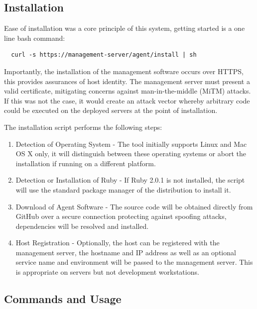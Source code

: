 \documentclass{cshonours}
\begin{document}
\subsection{Installation}

Ease of installation was a core principle of this system, getting started is a one line bash command:

\begin{verbatim}
  curl -s https://management-server/agent/install | sh
\end{verbatim}

Importantly, the installation of the management software occurs over HTTPS, this provides assurances of host identity. The management server must present a valid certificate, mitigating concerns against man-in-the-middle (MiTM) attacks. If this was not the case, it would create an attack vector whereby arbitrary code could be executed on the deployed servers at the point of installation.

The installation script performs the following steps:

\begin{enumerate}
  \item{Detection of Operating System} - The tool initially supports Linux and Mac OS X only, it will distinguish between these operating systems or abort the installation if running on a different platform.
  \item{Detection or Installation of Ruby} - If Ruby 2.0.1 is not installed, the script will use the standard package manager of the distribution to install it.
  \item{Download of Agent Software} - The source code will be obtained directly from GitHub over a secure connection protecting against spoofing attacks, dependencies will be resolved and installed.
  \item{Host Registration} - Optionally, the host can be registered with the management server, the hostname and IP address as well as an optional service name and environment will be passed to the management server. This is appropriate on servers but not development workstations.
\end{enumerate}

\subsection{Commands and Usage}
\end{document}
